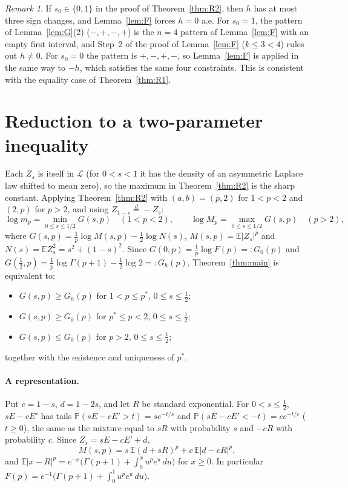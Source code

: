 \documentclass[11pt]{article}
\theoremstyle{remark}
\newtheorem{remark}[theorem]{Remark}
\newcommand{\E}{\mathbb E}
\begin{document}
\begin{remark}
If $s_0\in\{0,1\}$ in the proof of Theorem~\ref{thm:R2}, then $h$ has at most three sign changes, and Lemma~\ref{lem:F} forces $h=0$ a.e. For $s_0=1$, the pattern of Lemma~\ref{lem:G}(2) ($-,+,-,+$) is the $n=4$ pattern of Lemma~\ref{lem:F} with an empty first interval, and Step~2 of the proof of Lemma~\ref{lem:F} ($k\le3<4$) rules out $h\ne0$. For $s_0=0$ the pattern is $+,-,+,-$, so Lemma~\ref{lem:F} is applied in the same way to $-h$, which satisfies the same four constraints. This is consistent with the equality case of Theorem~\ref{thm:R1}.
\end{remark}

\section{Reduction to a two-parameter inequality}\label{sec:reduction}
Each $Z_s$ is itself in $\mathcal L$ (for $0<s<1$ it has the density of an asymmetric Laplace law shifted to mean zero), so the maximum in Theorem~\ref{thm:R2} is the sharp constant. Applying Theorem~\ref{thm:R2} with $(a,b)=(p,2)$ for $1<p<2$ and $(2,p)$ for $p>2$, and using $Z_{1-s}\overset d=-Z_s$:
\[
\log m_p=\min_{0\le s\le1/2}G(s,p)\quad(1<p<2),\qquad \log M_p=\max_{0\le s\le1/2}G(s,p)\quad(p>2),
\]
where $G(s,p)=\frac1p\log M(s,p)-\frac12\log N(s)$, $M(s,p)=\E|Z_s|^p$ and $N(s)=\E Z_s^2=s^2+(1-s)^2$. Since $G(0,p)=\frac1p\log F(p)=:G_0(p)$ and $G(\frac12,p)=\frac1p\log\Gamma(p+1)-\frac12\log2=:G_h(p)$, Theorem~\ref{thm:main} is equivalent to:
\begin{itemize}
\item[(T$_A$)] $G(s,p)\ge G_h(p)$ for $1<p\le p^*$, $0\le s\le\frac12$;
\item[(T$_B$)] $G(s,p)\ge G_0(p)$ for $p^*\le p<2$, $0\le s\le\frac12$;
\item[(T$_C$)] $G(s,p)\le G_0(p)$ for $p>2$, $0\le s\le\frac12$;
\end{itemize}
together with the existence and uniqueness of $p^*$.

\paragraph{A representation.} Put $c=1-s$, $d=1-2s$, and let $R$ be standard exponential. For $0<s\le\frac12$, $sE-cE'$ has tails $\mathbb P(sE-cE'>t)=se^{-t/s}$ and $\mathbb P(sE-cE'<-t)=ce^{-t/c}$ ($t\ge0$), the same as the mixture equal to $sR$ with probability $s$ and $-cR$ with probability $c$. Since $Z_s=sE-cE'+d$,
\begin{equation}\label{eq:rep}
M(s,p)=s\,\E(d+sR)^p+c\,\E|d-cR|^p,
\end{equation}
and $\E|x-R|^p=e^{-x}\bigl(\Gamma(p+1)+\int_0^xu^pe^u\,du\bigr)$ for $x\ge0$. In particular $F(p)=e^{-1}\bigl(\Gamma(p+1)+\int_0^1u^pe^u\,du\bigr)$.
\end{document}
